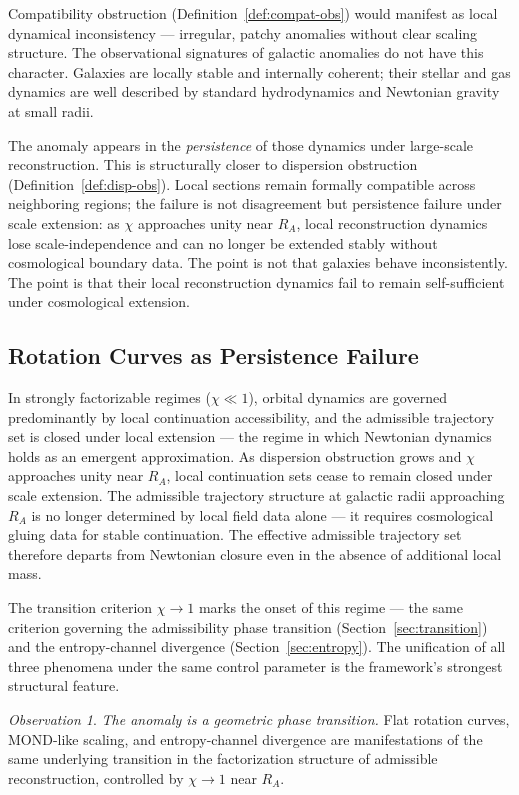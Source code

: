 \documentclass[11pt, a4paper]{article}
\theoremstyle{plain}
\theoremstyle{definition}
\theoremstyle{remark}
\newtheorem{observation}[theorem]{Observation}
\newcommand{\RA}{R_{\!A}}
\begin{document}
Compatibility obstruction (Definition~\ref{def:compat-obs}) would manifest as local
dynamical inconsistency --- irregular, patchy anomalies without clear scaling
structure. The observational signatures of galactic anomalies do not have this
character. Galaxies are locally stable and internally coherent; their stellar and gas
dynamics are well described by standard hydrodynamics and Newtonian gravity at small
radii.

The anomaly appears in the \emph{persistence} of those dynamics under large-scale
reconstruction. This is structurally closer to dispersion obstruction
(Definition~\ref{def:disp-obs}). Local sections remain formally compatible across
neighboring regions; the failure is not disagreement but persistence failure under
scale extension: as $\chi$ approaches unity near $\RA$, local reconstruction dynamics
lose scale-independence and can no longer be extended stably without cosmological
boundary data. The point is not that galaxies behave inconsistently. The point is
that their local reconstruction dynamics fail to remain self-sufficient under
cosmological extension.

\subsection{Rotation Curves as Persistence Failure}

In strongly factorizable regimes ($\chi \ll 1$), orbital dynamics are governed
predominantly by local continuation accessibility, and the admissible trajectory set
is closed under local extension --- the regime in which Newtonian dynamics holds as
an emergent approximation. As dispersion obstruction grows and $\chi$ approaches
unity near $\RA$, local continuation sets cease to remain closed under scale
extension. The admissible trajectory structure at galactic radii approaching $\RA$
is no longer determined by local field data alone --- it requires cosmological gluing
data for stable continuation. The effective admissible trajectory set therefore
departs from Newtonian closure even in the absence of additional local mass.

The transition criterion $\chi \to 1$ marks the onset of this regime --- the same
criterion governing the admissibility phase transition
(Section~\ref{sec:transition}) and the entropy-channel divergence
(Section~\ref{sec:entropy}). The unification of all three phenomena under the same
control parameter is the framework's strongest structural feature.

\begin{observation}
\label{obs:phase-transition-central}
\emph{The anomaly is a geometric phase transition.} Flat rotation curves, MOND-like
scaling, and entropy-channel divergence are manifestations of the same underlying
transition in the factorization structure of admissible reconstruction, controlled by
$\chi \to 1$ near $\RA$.
\end{observation}
\end{document}
